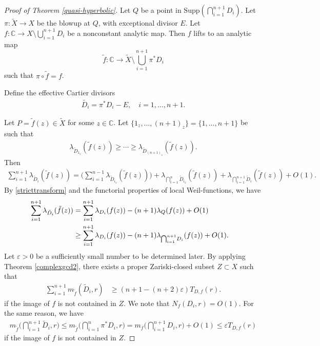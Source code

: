 \documentclass[10pt]{amsart}
\numberwithin{equation}{section}
\theoremstyle{plain}
\theoremstyle{definition}
\begin{document}
\begin{proof}[Proof of Theorem \ref{quasi-hyperbolic}]
Let $Q$ be a point in $\text{Supp} (\bigcap_{i=1}^{n+1}D_i)$. Let $\pi:\tilde{X}\to X$ be the blowup at $Q$, with exceptional divisor $E$.  Let $f:\mathbb{C}\to X\setminus{\bigcup_{i=1}^{n+1} } D_i$ be a nonconstant analytic map.  Then $f$ lifts to an analytic map 
$$
\tilde{f}:\mathbb C\to \tilde{X}\setminus{\bigcup_{i=1}^{n+1} } \pi^*D_i
$$ 
such that $\pi\circ \tilde f=f$.  

 Define the effective Cartier divisors 
\begin{align}\label{stricttransform}
\tilde{D_i}=\pi^*D_i-E, \quad i=1,\ldots,n+1.
\end{align}

Let $P=\tilde f(z)\in \tilde X$ for some $z\in \mathbb C$.
Let $ \{1_z,\ldots,(n+1)_z \}= \{1,\ldots,n+1\}$   be such that
\begin{align*}
  \lambda_{ \tilde D_{1_z}}(\tilde f(z))  \geq \cdots \geq\lambda_{\tilde  D_{(n+1)_z}}(\tilde f(z))  .
\end{align*}
Then 
\begin{align}\label{localWeilQz4}
 \sum_{i=1}^{n+1}\lambda_{ \tilde D_{i}}(\tilde f(z))= \bigg(\sum_{i=1}^{n-1}\lambda_{\tilde D_{i_z}}(\tilde f(z)) \bigg) +\lambda_{\bigcap_{i =1}^{n} \tilde D_{i_z} }(\tilde f(z))+\lambda_{ \bigcap_{i =1}^{n+1} \tilde D_{i}  } (\tilde f(z) )+O(1). 
\end{align}
By \eqref{stricttransform} and the functorial properties of local Weil-functions, we have 
\begin{align}\label{localWeilQz5}
 \sum_{i=1}^{n+1}\lambda_{ \tilde D_{i}}(\tilde f(z))&= \sum_{i=1}^{n+1} \lambda_{D_{i}}(f(z))-(n+1) \lambda_{Q}(f(z))+O(1)\cr
 &\ge  \sum_{i=1}^{n+1} \lambda_{D_{i}}(f(z))-(n+1) \lambda_{{\bigcap_{i=1}^{n+1} } D_i}(f(z))+O(1). 
\end{align}
Let $\varepsilon>0$ be a sufficiently small number to be determined later.
By applying Theorem \ref{complexgcd2}, there exists a proper Zariski-closed subset $Z\subset X$ such that  
\begin{align}\label{leftproxi}
  \sum_{i=1}^{n+1}m_{\tilde f}( \tilde D_{i},r)&\ge  (n+1-(n+2)\varepsilon )T_{D,f}(r).
 \end{align}
if the image of $f$ is not contained in $Z$.   We note that $N_{ f}(  D_{i},r)=O(1)$.
For the same reason, we have 
\begin{align}\label{rightproxi1}
 m_{\tilde f}\bigg( \bigcap_{i =1}^{n+1} \tilde D_{i} ,r\bigg)\le  m_{\tilde f}\bigg( \bigcap_{i =1}^n \pi^*D_{i}, r\bigg)
= m_{  f}\bigg( \bigcap_{i =1}^{n+1} D_{i} ,r\bigg)+O(1)\le  \varepsilon T_{D,f}(r)
\end{align}
if the image of $f$ is not contained in $Z$.


\end{proof}
\end{document}
